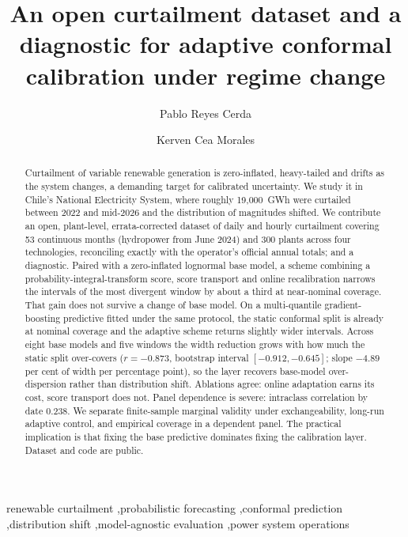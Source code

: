 \documentclass[preprint,3p,times]{elsarticle}
\begin{document}
\begin{frontmatter}

\title{An open curtailment dataset and a diagnostic for adaptive conformal calibration under regime change}

\author[usach]{Pablo Reyes Cerda}
\author[ubb]{Kerven Cea Morales}


\address[usach]{Mag\'ister en Gesti\'on de la Innovaci\'on y el Emprendimiento Tecnol\'ogico, Universidad de Santiago de Chile, Santiago, Chile}
\address[ubb]{Programa de Doctorado en Matem\'atica Aplicada, Universidad del B\'io-B\'io, Concepci\'on, Chile}

\begin{abstract}
Curtailment of variable renewable generation is zero-inflated, heavy-tailed and drifts as the system changes, a demanding target for calibrated uncertainty. We study it in Chile's National Electricity System, where roughly 19{,}000~GWh were curtailed between 2022 and mid-2026 and the distribution of magnitudes shifted. We contribute an open, plant-level, errata-corrected dataset of daily and hourly curtailment covering 53 continuous months (hydropower from June 2024) and 300 plants across four technologies, reconciling exactly with the operator's official annual totals; and a diagnostic. Paired with a zero-inflated lognormal base model, a scheme combining a probability-integral-transform score, score transport and online recalibration narrows the intervals of the most divergent window by about a third at near-nominal coverage. That gain does not survive a change of base model. On a multi-quantile gradient-boosting predictive fitted under the same protocol, the static conformal split is already at nominal coverage and the adaptive scheme returns slightly wider intervals. Across eight base models and five windows the width reduction grows with how much the static split over-covers ($r=-0.873$, bootstrap interval $[-0.912, -0.645]$; slope $-4.89$ per cent of width per percentage point), so the layer recovers base-model over-dispersion rather than distribution shift. Ablations agree: online adaptation earns its cost, score transport does not. Panel dependence is severe: intraclass correlation by date 0.238. We separate finite-sample marginal validity under exchangeability, long-run adaptive control, and empirical coverage in a dependent panel. The practical implication is that fixing the base predictive dominates fixing the calibration layer. Dataset and code are public.
\end{abstract}

\begin{keyword}
renewable curtailment \sep probabilistic forecasting \sep conformal prediction \sep distribution shift \sep model-agnostic evaluation \sep power system operations
\end{keyword}

\end{frontmatter}
\end{document}
